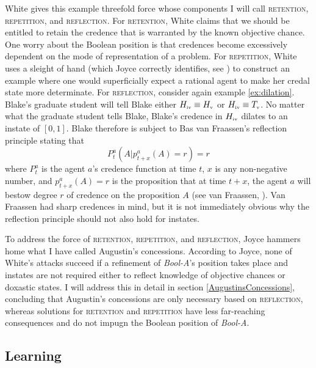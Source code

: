 \documentclass[11pt]{article}
\newcommand{\anderson}[0]{\textit{Bool-A}}
\begin{document}
White gives this example threefold force whose components I will call
\textsc{retention}, \textsc{repetition}, and \textsc{reflection}. For
\textsc{retention}, White claims that we should be entitled to retain
the credence that is warranted by the known objective chance. One
worry about the Boolean position is that credences become excessively
dependent on the mode of representation of a problem. For
\textsc{repetition}, White uses a sleight of hand (which Joyce
correctly identifies, see ) to construct an
example where one would superficially expect a rational agent to make
her credal state more determinate. For \textsc{reflection}, consider
again example \ref{ex:dilation}. Blake's graduate student will tell
Blake either $H_{\mbox{\tiny{iv}}}\equiv{}H_{\mbox{\tiny{v}}}$ or
$H_{\mbox{\tiny{iv}}}\equiv{}T_{\mbox{\tiny{v}}}$. No matter what the
graduate student tells Blake, Blake's credence in
$H_{\mbox{\tiny{iv}}}$ dilates to an instate of $[0,1]$. Blake
therefore is subject to Bas van Fraassen's reflection principle
stating that
  \begin{equation}
    \label{eq:reflection}
    P_{t}^{a}(A|p_{t+x}^{a}(A)=r)=r
  \end{equation}
where $P_{t}^{a}$ is the agent $a$'s credence function at time $t$,
$x$ is any non-negative number, and $p_{t+x}^{a}(A)=r$ is the
proposition that at time $t+x$, the agent $a$ will bestow degree $r$
of credence on the proposition $A$ (see van
Fraassen, ). Van Fraassen had sharp
credences in mind, but it is not immediately obvious why the
reflection principle should not also hold for instates.

To address the force of \textsc{retention}, \textsc{repetition}, and
\textsc{reflection}, Joyce hammers home what I have called Augustin's
concessions. According to Joyce, none of White's attacks succeed if a
refinement of {\anderson}'s position takes place and instates are not
required either to reflect knowledge of objective chances or doxastic
states. I will address this in detail in section
\ref{AugustinsConcessions}, concluding that Augustin's concessions are
only necessary based on \textsc{reflection}, whereas solutions for
\textsc{retention} and \textsc{repetition} have less far-reaching
consequences and do not impugn the Boolean position of {\anderson}.

\subsection{Learning}
\label{learning}
\end{document}
